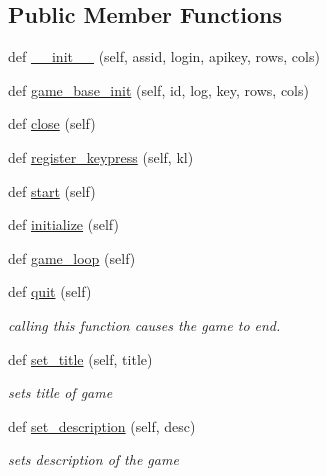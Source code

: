 \subsection*{Public Member Functions}
\begin{DoxyCompactItemize}
\item 
def \hyperlink{classbridges_1_1gamebase_1_1_game_base_a590e8712065678b03ccd8a6012b7220f}{\+\_\+\+\_\+init\+\_\+\+\_\+} (self, assid, login, apikey, rows, cols)
\item 
def \hyperlink{classbridges_1_1gamebase_1_1_game_base_a397e82bd17f18bc60286bc7479e959ac}{game\+\_\+base\+\_\+init} (self, id, log, key, rows, cols)
\item 
def \hyperlink{classbridges_1_1gamebase_1_1_game_base_aa30b096b3b2834d36a05acd982625517}{close} (self)
\item 
def \hyperlink{classbridges_1_1gamebase_1_1_game_base_ac60243e192a502fb7be51f86eb5b76b6}{register\+\_\+keypress} (self, kl)
\item 
def \hyperlink{classbridges_1_1gamebase_1_1_game_base_a05a30fccf88c2baba1137b5a06ba2ed7}{start} (self)
\item 
def \hyperlink{classbridges_1_1gamebase_1_1_game_base_a336629d190f1601f1211ca57e4d5427d}{initialize} (self)
\item 
def \hyperlink{classbridges_1_1gamebase_1_1_game_base_af650eeb756558d2cbcae43c74de5cce7}{game\+\_\+loop} (self)
\item 
def \hyperlink{classbridges_1_1gamebase_1_1_game_base_a21742d4e630fa64dc76848c7b4fcb344}{quit} (self)
\begin{DoxyCompactList}\small\item\em calling this function causes the game to end. \end{DoxyCompactList}\item 
def \hyperlink{classbridges_1_1gamebase_1_1_game_base_a7e7d4033c4b191b3699dbf0cb5f25933}{set\+\_\+title} (self, title)
\begin{DoxyCompactList}\small\item\em sets title of game \end{DoxyCompactList}\item 
def \hyperlink{classbridges_1_1gamebase_1_1_game_base_a75ecd56daf08036207772d6ce81c90b1}{set\+\_\+description} (self, desc)
\begin{DoxyCompactList}\small\item\em sets description of the game \end{DoxyCompactList}\item 

\end{DoxyCompactItemize}
